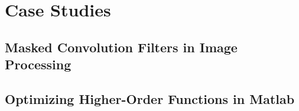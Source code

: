 \chapter{Case Studies}

\section{Masked Convolution Filters in Image Processing}

\section{Optimizing Higher-Order Functions in Matlab}
